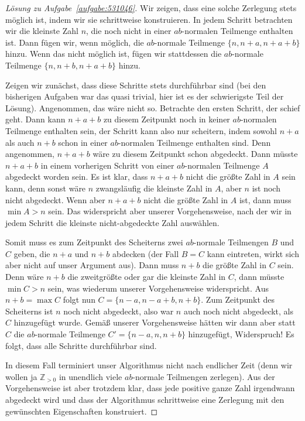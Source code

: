 \begin{proof}[Lösung zu Aufgabe~\ref{aufgabe:531046}]
	Wir zeigen, dass eine solche Zerlegung stets möglich ist, indem wir sie schrittweise konstruieren. In jedem Schritt betrachten wir die kleinste Zahl $n$, die noch nicht in einer $ab$-normalen Teilmenge enthalten ist. Dann fügen wir, wenn möglich, die $ab$-normale Teilmenge $\{n,n+a,n+a+b\}$ hinzu. Wenn das nicht möglich ist, fügen wir stattdessen die $ab$-normale Teilmenge $\{n,n+b,n+a+b\}$ hinzu.
	
	Zeigen wir zunächst, dass diese Schritte stets durchführbar sind (bei den bisherigen Aufgaben war das quasi trivial, hier ist es der schwierigste Teil der Lösung). Angenommen, das wäre nicht so. Betrachte den ersten Schritt, der schief geht. Dann kann $n+a+b$ zu diesem Zeitpunkt noch in keiner $ab$-normalen Teilmenge enthalten sein, der Schritt kann also nur scheitern, indem sowohl $n+a$ als auch $n+b$ schon in einer $ab$-normalen Teilmenge enthalten sind. Denn angenommen, $n+a+b$ wäre zu diesem Zeitpunkt schon abgedeckt. Dann müsste $n+a+b$ in einem vorherigen Schritt von einer $ab$-normalen Teilmenge $A$ abgedeckt worden sein. Es ist klar, dass $n+a+b$ nicht die größte Zahl in $A$ sein kann, denn sonst wäre $n$ zwangsläufig die kleinste Zahl in $A$, aber $n$ ist noch nicht abgedeckt. Wenn aber $n+a+b$ nicht die größte Zahl in $A$ ist, dann muss $\min A> n$ sein. Das widerspricht aber unserer Vorgehensweise, nach der wir in jedem Schritt die kleinste nicht-abgedeckte Zahl auswählen.
	
	Somit muss es zum Zeitpunkt des Scheiterns zwei $ab$-normale Teilmengen $B$ und $C$ geben, die $n+a$ und $n+b$ abdecken (der Fall $B=C$ kann eintreten, wirkt sich aber nicht auf unser Argument aus). Dann muss $n+b$ die größte Zahl in $C$ sein. Denn wäre $n+b$ die zweitgrößte oder gar die kleinste Zahl in $C$, dann müsste $\min C>n$ sein, was wiederum unserer Vorgehensweise widerspricht. Aus $n+b=\max C$ folgt nun $C=\{n-a,n-a+b,n+b\}$. Zum Zeitpunkt des Scheiterns ist $n$ noch nicht abgedeckt, also war $n$ auch noch nicht abgedeckt, als $C$ hinzugefügt wurde. Gemäß unserer Vorgehensweise hätten wir dann aber statt $C$ die $ab$-normale Teilmenge $C'=\{n-a,n,n+b\}$ hinzugefügt, Widerspruch! Es folgt, dass alle Schritte durchführbar sind.
	
	In diesem Fall terminiert unser Algorithmus nicht nach endlicher Zeit (denn wir wollen ja $\mathbb Z_{>0}$ in unendlich viele $ab$-normale Teilmengen zerlegen). Aus der Vorgehensweise ist aber trotzdem klar, dass jede positive ganze Zahl irgendwann abgedeckt wird und dass der Algorithmus schrittweise eine Zerlegung mit den gewünschten Eigenschaften konstruiert.
\end{proof}
